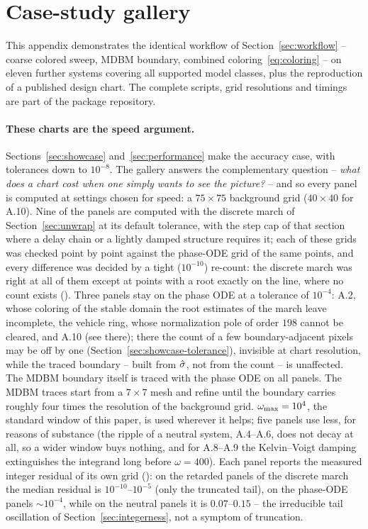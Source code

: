 \section{Case-study gallery}\label{app:gallery}

This appendix demonstrates the identical workflow of
Section~\ref{sec:workflow} -- coarse colored sweep, MDBM boundary, combined
coloring~\eqref{eq:coloring} -- on eleven further systems covering all
supported model classes, plus the reproduction of a published design
chart. The complete scripts, grid resolutions and timings are part of the
package repository.

\paragraph{These charts are the speed argument.} Sections~\ref{sec:showcase}
and~\ref{sec:performance} make the accuracy case, with tolerances down to
$10^{-8}$. The gallery answers the complementary question -- \emph{what does a
chart cost when one simply wants to see the picture?} -- and so every panel
is computed at settings chosen for speed: a $75\times75$ background grid
($40\times40$ for A.10). Nine of the panels are computed with the discrete
march of Section~\ref{sec:unwrap} at its default tolerance, with the step cap
of that section where a delay chain or a lightly damped structure requires it;
each of these grids was checked point by point against the phase-ODE grid of
the same points, and every difference was decided by a tight ($10^{-10}$)
re-count: the discrete march was right at all of them except at points with a
root exactly on the line, where no count exists
(). Three panels stay on the phase ODE at a
tolerance of $10^{-4}$: A.2, whose coloring of the stable domain the root
estimates of the march leave incomplete, the vehicle ring, whose
normalization pole of order $198$ cannot be cleared, and A.10 (see there);
there the count of a few boundary-adjacent pixels may be off by
one (Section~\ref{sec:showcase-tolerance}), invisible at chart resolution,
while the traced boundary -- built from $\hat{\sigma}$, not from the count -- is
unaffected. The MDBM boundary itself is traced with the phase ODE on all
panels. The
MDBM traces start from a $7\times7$ mesh and refine until the boundary
carries roughly four times the resolution of the background grid.
$\omega_{\mathrm{max}}=10^{4}$, the standard window of this paper, is used wherever it
helps; five panels use less, for reasons of substance (the ripple of a
neutral system, A.4--A.6, does not decay at all, so a wider window buys
nothing, and for A.8--A.9 the Kelvin--Voigt damping extinguishes the
integrand long before $\omega=400$). Each panel reports the measured integer
residual of its own grid (): on the retarded
panels of the discrete march the median residual is $10^{-10}$--$10^{-5}$
(only the truncated tail), on the phase-ODE panels $\sim10^{-4}$, while on
the neutral panels it is $0.07$--$0.15$ -- the irreducible tail oscillation
of Section~\ref{sec:integerness}, not a symptom of truncation.

